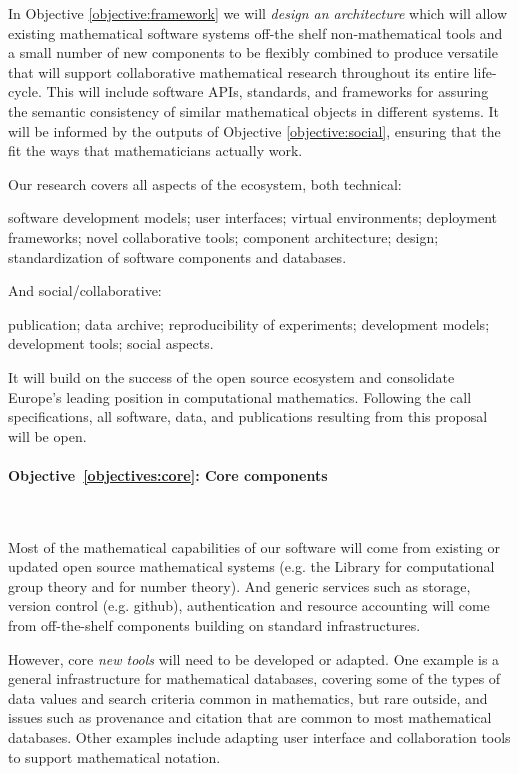 \documentclass[noworkareas,deliverables,\classoptions]{euproposal}       %
\begin{document}
\begin{proposal}
In Objective \ref{objective:framework} we will \emph{design an
  architecture} which will allow existing mathematical software
systems off-the shelf non-mathematical tools and a small number of new
components to be flexibly combined to produce versatile \VREs that will support
collaborative mathematical research throughout its entire
life-cycle. This will include software APIs, standards, and
frameworks for assuring the semantic consistency of similar
mathematical objects in different systems. It will be informed by the
outputs of Objective \ref{objective:social}, ensuring that the \VREs
fit the ways that mathematicians actually work.

Our research covers all aspects of the ecosystem, both technical:
\begin{compactitem}
  \item software development models; user
    interfaces; virtual environments; deployment frameworks; novel
    collaborative tools; component architecture; design; 
    standardization of software components and databases. 
\end{compactitem}
And social/collaborative:
\begin{compactitem}
 \item publication; data archive; reproducibility of experiments;
development models; development tools; social aspects. 
\end{compactitem}
It will build on the success of the open source ecosystem and
consolidate Europe's leading position in computational mathematics.
Following the call specifications, all software, data, and
publications resulting from this proposal will be open.

\paragraph{Objective~\ref{objectives:core}: Core components}\

Most of the mathematical capabilities of our software will come
from existing or updated open source mathematical systems (e.g. the
\GAP Library for computational group theory and \PariGP for number
theory). And generic services such as storage, version control
(e.g. github), authentication and resource accounting will come from
off-the-shelf components building on standard infrastructures.

However, core \emph{new tools} will need to be developed or
adapted. One example is a general infrastructure for mathematical
databases, covering some of the types of data values and search
criteria common in mathematics, but rare outside, and issues such as
provenance and citation that are common to most mathematical
databases. Other examples include adapting user interface and
collaboration tools to support mathematical notation. 


\end{proposal}
\end{document}
